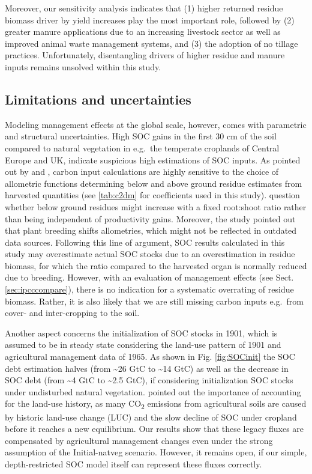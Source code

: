 \documentclass[gc, manuscript]{copernicus}
\begin{document}
Moreover, our sensitivity analysis indicates that (1) higher returned residue biomass driver by yield increases play the most important role, followed by (2) greater manure applications due to an increasing livestock sector as well as improved animal waste management systems, and (3) the adoption of no tillage practices. Unfortunately, disentangling drivers of higher residue and manure inputs remains unsolved within this study.

\hypertarget{limitations-and-uncertainties}{%
\subsection{Limitations and uncertainties}\label{limitations-and-uncertainties}}

Modeling management effects at the global scale, however, comes with parametric and structural uncertainties. High SOC gains in the first 30 cm of the soil compared to natural vegetation in e.g.~the temperate croplands of Central Europe and UK, indicate suspicious high estimations of SOC inputs. As pointed out by \citep{keel_large_2017} and \citep{smith_how_2020}, carbon input calculations are highly sensitive to the choice of allometric functions determining below and above ground residue estimates from harvested quantities (see \ref{tab:c2dm} for coefficients used in this study). \citep{keel_large_2017} question whether below ground residues might increase with a fixed root:shoot ratio rather than being independent of productivity gains. Moreover, the study pointed out that plant breeding shifts allometries, which might not be reflected in outdated data sources. Following this line of argument, SOC results calculated in this study may overestimate actual SOC stocks due to an overestimation in residue biomass, for which the ratio compared to the harvested organ is normally reduced due to breeding. However, with an evaluation of management effects (see Sect. \ref{sec:ipcccompare}), there is no indication for a systematic overrating of residue biomass. Rather, it is also likely that we are still missing carbon inputs e.g.~from cover- and inter-cropping to the soil.

Another aspect concerns the initialization of SOC stocks in 1901, which is assumed to be in steady state considering the land-use pattern of 1901 and agricultural management data of 1965. As shown in Fig. \ref{fig:SOCinit} the SOC debt estimation halves (from \textasciitilde26 GtC to \textasciitilde14 GtC) as well as the decrease in SOC debt (from \textasciitilde4 GtC to \textasciitilde2.5 GtC), if considering initialization SOC stocks under undisturbed natural vegetation. \citep{pugh_simulated_2015} pointed out the importance of accounting for the land-use history, as many CO\textsubscript{2} emissions from agricultural soils are caused by historic land-use change (LUC) and the slow decline of SOC under cropland before it reaches a new equilibrium. Our results show that these legacy fluxes are compensated by agricultural management changes even under the strong assumption of the Initial-natveg scenario. However, it remains open, if our simple, depth-restricted SOC model itself can represent these fluxes correctly.
\end{document}
